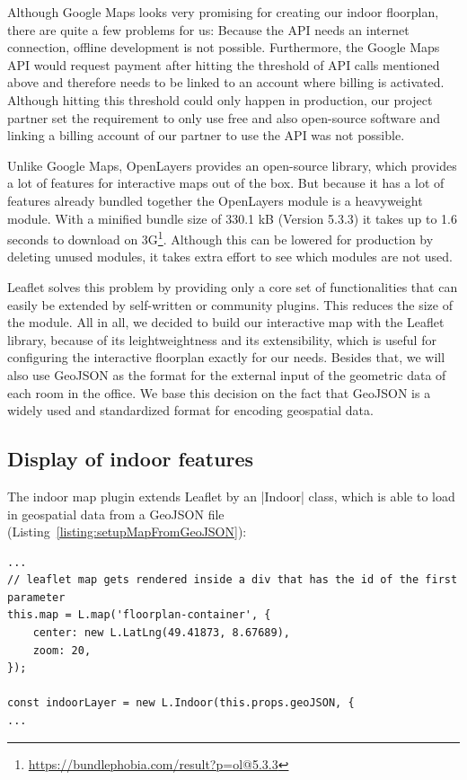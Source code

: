 Although Google Maps looks very promising for creating our indoor floorplan, there are quite a few problems for us: Because the API needs an internet connection, offline development is not possible. 
Furthermore, the Google Maps API would request payment after hitting the threshold of API calls mentioned above and therefore needs to be linked to an account where billing is activated. Although hitting this threshold could only happen in production, our project partner set the requirement to only use free and also open-source software and linking a billing account of our partner to use the API was not possible. 

Unlike Google Maps, OpenLayers provides an open-source library, which provides a lot of features for interactive maps out of the box.
But because it has a lot of features already bundled together the OpenLayers module is a heavyweight module. With a minified bundle size of 330.1 kB (Version 5.3.3) it takes up to 1.6 seconds to download on 3G\footnote{\url{https://bundlephobia.com/result?p=ol@5.3.3}}. Although this can be lowered for production by deleting unused modules, it takes extra effort to see which modules are not used.

Leaflet solves this problem by providing only a core set of functionalities that can easily be extended by self-written or community plugins. This reduces the size of the module. All in all, we decided to build our interactive map with the Leaflet library, because of its leightweightness and its extensibility, which is useful for configuring the interactive floorplan exactly for our needs. Besides that, we will also use GeoJSON as the format for the external input of the geometric data of each room in the office. We base this decision on the fact that GeoJSON is a widely used and standardized format for encoding geospatial data.

\subsection{Display of indoor features}
\label{Display of indoor features}

The indoor map plugin extends Leaflet by an |Indoor| class, which is able to load in geospatial data from a GeoJSON file (Listing~\ref{listing:setupMapFromGeoJSON}):

\begin{lstlisting}[label={listing:setupMapFromGeoJSON},caption={Setup map from GeoJSON data}]
...
// leaflet map gets rendered inside a div that has the id of the first parameter
this.map = L.map('floorplan-container', {
    center: new L.LatLng(49.41873, 8.67689),
    zoom: 20,
});

const indoorLayer = new L.Indoor(this.props.geoJSON, {
...
\end{lstlisting}

